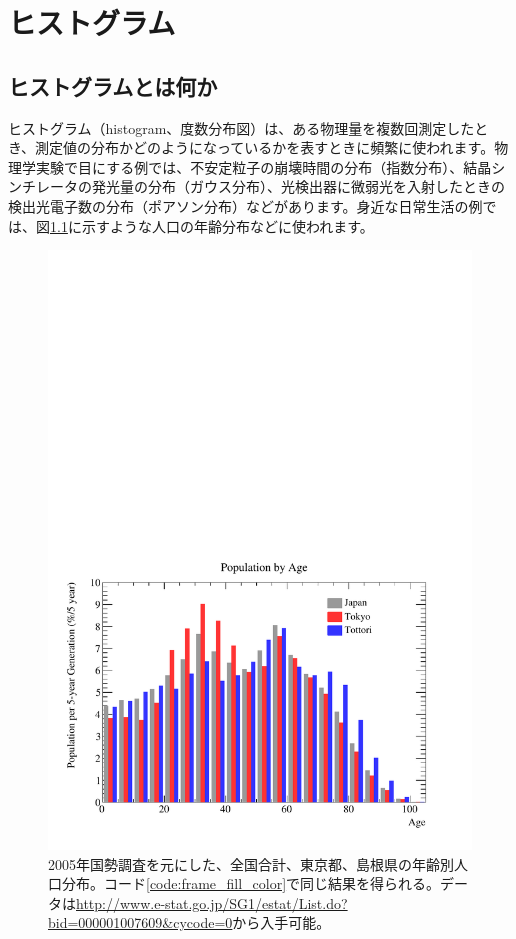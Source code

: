 \chapter{ヒストグラム}
\label{chap:Histogram}

\section{ヒストグラムとは何か}

ヒストグラム（histogram、度数分布図）は、ある物理量を複数回測定したとき、測定値の分布かどのようになっているかを表すときに頻繁に使われます。物理学実験で目にする例では、不安定粒子の崩壊時間の分布（指数分布）、結晶シンチレータの発光量の分布（ガウス分布）、光検出器に微弱光を入射したときの検出光電子数の分布（ポアソン分布）などがあります。身近な日常生活の例では、図\ref{fig:population_pdf}に示すような人口の年齢分布などに使われます。

\begin{figure}
  \centering
  \includegraphics[width=12cm,clip]{fig/population.pdf}
  \caption{2005年国勢調査を元にした、全国合計、東京都、島根県の年齢別人口分布。コード\ref{code:frame_fill_color}で同じ結果を得られる。データは\url{http://www.e-stat.go.jp/SG1/estat/List.do?bid=000001007609&cycode=0}から入手可能。}
  \label{fig:population_pdf}
\end{figure}

